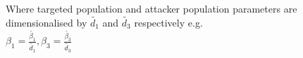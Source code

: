  Where targeted population and attacker population parameters are dimensionalised by $\tilde{d_1}$ and $\tilde{d_3}$ respectively e.g.\\

 $\beta_1=\frac{\tilde{\beta_1}}{\tilde{d_1}},\beta_3=\frac{\tilde{\beta_3}}{\tilde{d_3}}$\\





































